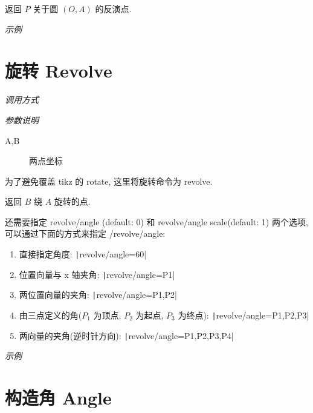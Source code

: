 返回 $P$ 关于圆 $(O,A)$ 的反演点.

\emph{示例}


\section{旋转 Revolve}

\emph{调用方式}

\begin{tcolorbox}{}
\end{tcolorbox}

\emph{参数说明}

\begin{description}
  \item[A,B] 两点坐标
\end{description}

\begin{remark*}
  为了避免覆盖 tikz 的 rotate, 这里将旋转命令为 revolve.
\end{remark*}

返回 $B$ 绕 $A$ 旋转的点.

还需要指定 revolve/angle (default: 0) 和 revolve/angle scale(default: 1) 两个选项,可以通过下面的方式来指定 /revolve/angle:

\begin{enumerate}
  \item 直接指定角度: \texttt|revolve/angle=60|
  \item 位置向量与 x 轴夹角: \texttt|revolve/angle={P1}|
  \item 两位置向量的夹角: \texttt|revolve/angle={P1,P2}|
  \item 由三点定义的角($P_1$ 为顶点, $P_2$ 为起点, $P_3$ 为终点): \texttt|revolve/angle={P1,P2,P3}|
  \item 两向量的夹角(逆时针方向): \texttt|revolve/angle={P1,P2,P3,P4}|
\end{enumerate}

\emph{示例}




\section{构造角 Angle}


